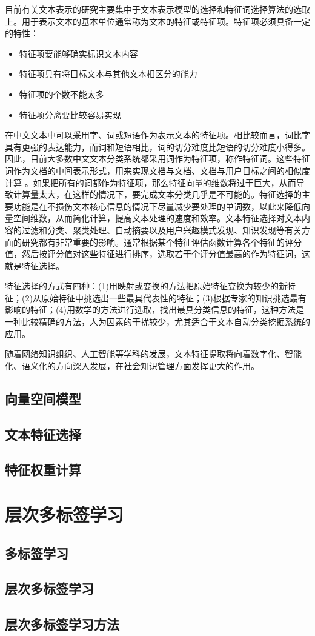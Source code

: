     目前有关文本表示的研究主要集中于文本表示模型的选择和特征词选择算法的选取上。用于表示文本的基本单位通常称为文本的特征或特征项。特征项必须具备一定的特性：
    \begin{itemize}
      \item 特征项要能够确实标识文本内容
      \item 特征项具有将目标文本与其他文本相区分的能力
      \item 特征项的个数不能太多
      \item 特征项分离要比较容易实现
    \end{itemize}
    在中文文本中可以采用字、词或短语作为表示文本的特征项。相比较而言，词比字具有更强的表达能力，而词和短语相比，词的切分难度比短语的切分难度小得多。因此，目前大多数中文文本分类系统都采用词作为特征项，称作特征词。这些特征词作为文档的中间表示形式，用来实现文档与文档、文档与用户目标之间的相似度计算 。如果把所有的词都作为特征项，那么特征向量的维数将过于巨大，从而导致计算量太大，在这样的情况下，要完成文本分类几乎是不可能的。特征选择的主要功能是在不损伤文本核心信息的情况下尽量减少要处理的单词数，以此来降低向量空间维数，从而简化计算，提高文本处理的速度和效率。文本特征选择对文本内容的过滤和分类、聚类处理、自动摘要以及用户兴趣模式发现、知识发现等有关方面的研究都有非常重要的影响。通常根据某个特征评估函数计算各个特征的评分值，然后按评分值对这些特征进行排序，选取若干个评分值最高的作为特征词，这就是特征选择。
    
    特征选择的方式有四种：(1)用映射或变换的方法把原始特征变换为较少的新特征；(2)从原始特征中挑选出一些最具代表性的特征；(3)根据专家的知识挑选最有影响的特征；(4)用数学的方法进行选取，找出最具分类信息的特征，这种方法是一种比较精确的方法，人为因素的干扰较少，尤其适合于文本自动分类挖掘系统的应用。

    随着网络知识组织、人工智能等学科的发展，文本特征提取将向着数字化、智能化、语义化的方向深入发展，在社会知识管理方面发挥更大的作用。

    \subsection{向量空间模型}
    
    \subsection{文本特征选择}
    \subsection{特征权重计算}

    \section{层次多标签学习}

    \subsection{多标签学习}
    \subsection{层次多标签学习}
    \subsection{层次多标签学习方法}

